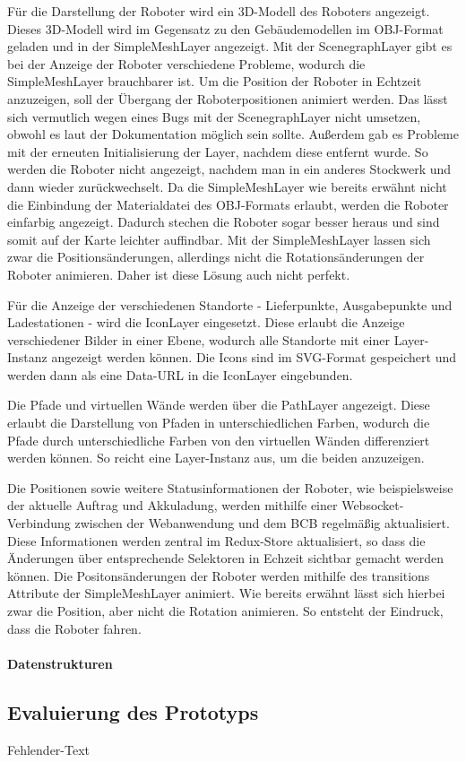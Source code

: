 Für die Darstellung der Roboter wird ein 3D-Modell des Roboters angezeigt. Dieses 3D-Modell wird im Gegensatz zu den Gebäudemodellen im \ac{OBJ}-Format geladen und in der SimpleMeshLayer angezeigt. Mit der ScenegraphLayer gibt es bei der Anzeige der Roboter verschiedene Probleme, wodurch die SimpleMeshLayer brauchbarer ist. Um die Position der Roboter in Echtzeit anzuzeigen, soll der Übergang der Roboterpositionen animiert werden. Das lässt sich vermutlich wegen eines Bugs mit der ScenegraphLayer nicht umsetzen, obwohl es laut der Dokumentation möglich sein sollte. Außerdem gab es Probleme mit der erneuten Initialisierung der Layer, nachdem diese entfernt wurde. So werden die Roboter nicht angezeigt, nachdem man in ein anderes Stockwerk und dann wieder zurückwechselt. Da die SimpleMeshLayer wie bereits erwähnt nicht die Einbindung der Materialdatei des \ac{OBJ}-Formats erlaubt, werden die Roboter einfarbig angezeigt. Dadurch stechen die Roboter sogar besser heraus und sind somit auf der Karte leichter auffindbar. Mit der SimpleMeshLayer lassen sich zwar die Positionsänderungen, allerdings nicht die Rotationsänderungen der Roboter animieren. Daher ist diese Lösung auch nicht perfekt.

Für die Anzeige der verschiedenen Standorte - Lieferpunkte, Ausgabepunkte und Ladestationen - wird die IconLayer eingesetzt. Diese erlaubt die Anzeige verschiedener Bilder in einer Ebene, wodurch alle Standorte mit einer Layer-Instanz angezeigt werden können. 
Die Icons sind im \ac{SVG}-Format gespeichert und werden dann als eine Data-URL in die IconLayer eingebunden.

Die Pfade und virtuellen Wände werden über die PathLayer angezeigt. Diese erlaubt die Darstellung von Pfaden in unterschiedlichen Farben, wodurch die Pfade durch unterschiedliche Farben von den virtuellen Wänden differenziert werden können.
So reicht eine Layer-Instanz aus, um die beiden anzuzeigen.

Die Positionen sowie weitere Statusinformationen der Roboter, wie beispielsweise der aktuelle Auftrag und Akkuladung, werden mithilfe einer \gls{Websocket}-Verbindung zwischen der Webanwendung und dem \ac{BCB} regelmäßig aktualisiert. Diese Informationen werden zentral im Redux-Store aktualisiert, so dass die Änderungen über entsprechende Selektoren in Echzeit sichtbar gemacht werden können. Die Positonsänderungen der Roboter werden mithilfe des transitions Attribute der SimpleMeshLayer animiert. Wie bereits erwähnt lässt sich hierbei zwar die Position, aber nicht die Rotation animieren. So entsteht der Eindruck, dass die Roboter fahren.

\paragraph{Datenstrukturen}

\newpage
\subsection{Evaluierung des Prototyps}
Fehlender-Text